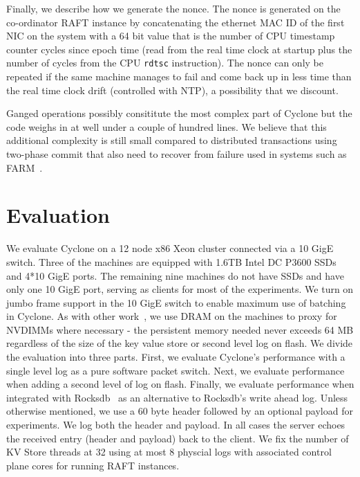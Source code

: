\documentclass[pageno]{jpaper}
\begin{document}
Finally, we describe how we generate the nonce. The nonce is generated on the
co-ordinator RAFT instance by concatenating the ethernet MAC ID of the first NIC
on the system with a 64 bit value that is the number of CPU timestamp counter
cycles since epoch time (read from the real time clock at startup plus the
number of cycles from the CPU {\tt rdtsc} instruction). The nonce can only be
repeated if the same machine manages to fail and come back up in less time than
the real time clock drift (controlled with NTP), a possibility that we discount.

Ganged operations possibly consititute the most complex part of Cyclone but the
code weighs in at well under a couple of hundred lines. We believe that
this additional complexity is still small compared to distributed transactions
using two-phase commit that also need to recover from failure used in systems
such as FARM~\cite{farm}.

\section{Evaluation}
\label{sec:evaluation}
We evaluate Cyclone on a 12 node x86 Xeon cluster connected via a 10 GigE
switch. Three of the machines are equipped with 1.6TB Intel DC P3600 SSDs and
4*10 GigE ports. The remaining nine machines do not have SSDs and have only one
10 GigE port, serving as clients for most of the experiments. We turn on jumbo
frame support in the 10 GigE switch to enable maximum use of batching in
Cyclone. As with other work~\cite{faast}, we use DRAM on the machines to proxy
for NVDIMMs where necessary - the persistent memory needed never exceeds 64 MB
regardless of the size of the key value store or second level log on flash. We
divide the evaluation into three parts. First, we evaluate Cyclone's performance
with a single level log as a pure software packet switch. Next, we evaluate
performance when adding a second level of log on flash. Finally, we evaluate
performance when integrated with Rocksdb~\cite{rocksdb} as an alternative to
Rocksdb's write ahead log. Unless otherwise mentioned, we use a 60 byte header
followed by an optional payload for experiments. We log both the header and
payload. In all cases the server echoes the received entry (header and payload)
back to the client. We fix the number of KV Store threads at 32 using at most 8
physcial logs with associated control plane cores for running RAFT instances.
\end{document}
